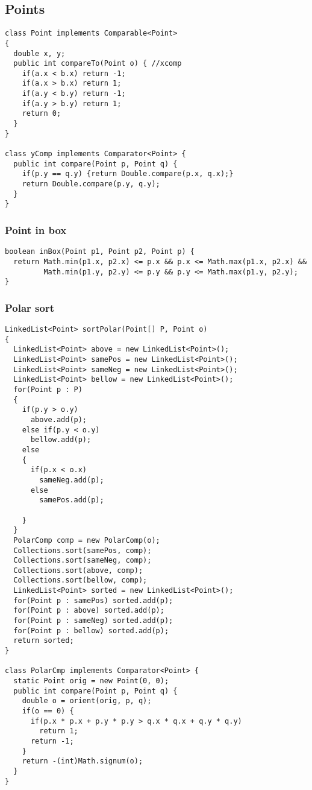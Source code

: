 \subsection{Points}
\begin{lstlisting}
class Point implements Comparable<Point>
{
  double x, y;
  public int compareTo(Point o) { //xcomp
    if(a.x < b.x) return -1;
    if(a.x > b.x) return 1;
    if(a.y < b.y) return -1;
    if(a.y > b.y) return 1;
    return 0;
  }
}

class yComp implements Comparator<Point> {
  public int compare(Point p, Point q) {
    if(p.y == q.y) {return Double.compare(p.x, q.x);}
    return Double.compare(p.y, q.y);
  }
}
\end{lstlisting}

\subsubsection{Point in box}
\begin{lstlisting}
boolean inBox(Point p1, Point p2, Point p) {
  return Math.min(p1.x, p2.x) <= p.x && p.x <= Math.max(p1.x, p2.x) &&			           
         Math.min(p1.y, p2.y) <= p.y && p.y <= Math.max(p1.y, p2.y);
}
\end{lstlisting}

\subsubsection{Polar sort}
\begin{lstlisting}
LinkedList<Point> sortPolar(Point[] P, Point o)
{
  LinkedList<Point> above = new LinkedList<Point>();
  LinkedList<Point> samePos = new LinkedList<Point>();
  LinkedList<Point> sameNeg = new LinkedList<Point>();
  LinkedList<Point> bellow = new LinkedList<Point>();
  for(Point p : P)
  {
    if(p.y > o.y)
      above.add(p);
    else if(p.y < o.y)
      bellow.add(p);
    else
    {
      if(p.x < o.x)
        sameNeg.add(p);
      else
        samePos.add(p);

    }
  }
  PolarComp comp = new PolarComp(o);    
  Collections.sort(samePos, comp);
  Collections.sort(sameNeg, comp);
  Collections.sort(above, comp);
  Collections.sort(bellow, comp);
  LinkedList<Point> sorted = new LinkedList<Point>();
  for(Point p : samePos) sorted.add(p);
  for(Point p : above) sorted.add(p);
  for(Point p : sameNeg) sorted.add(p);
  for(Point p : bellow) sorted.add(p);
  return sorted;
}

class PolarCmp implements Comparator<Point> {
  static Point orig = new Point(0, 0);
  public int compare(Point p, Point q) {
    double o = orient(orig, p, q);
    if(o == 0) {
      if(p.x * p.x + p.y * p.y > q.x * q.x + q.y * q.y)
        return 1;
      return -1;
    }
    return -(int)Math.signum(o);
  }
}
\end{lstlisting}

